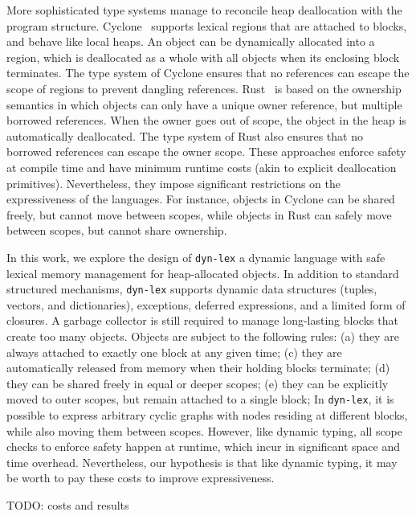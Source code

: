 \documentclass[12pt]{article}
\newcommand{\code}[1] {\texttt{\footnotesize{#1}}}
\newcommand{\lex} {\code{dyn-lex}\xspace}
\begin{document}
More sophisticated type systems manage to reconcile heap deallocation with the
program structure.
%
Cyclone~\cite{TODO} supports lexical regions that are attached to blocks, and
behave like local heaps.
An object can be dynamically allocated into a region, which is deallocated as a
whole with all objects when its enclosing block terminates.
The type system of Cyclone ensures that no references can escape the scope of
regions to prevent dangling references.
%
Rust~\cite{TODO} is based on the ownership semantics in which objects can only
have a unique owner reference, but multiple borrowed references.
When the owner goes out of scope, the object in the heap is automatically
deallocated.
The type system of Rust also ensures that no borrowed references can escape the
owner scope.
%
These approaches enforce safety at compile time and have minimum runtime costs
(akin to explicit deallocation primitives).
Nevertheless, they impose significant restrictions on the expressiveness of the
languages.
For instance, objects in Cyclone can be shared freely, but cannot move between
scopes, while objects in Rust can safely move between scopes, but cannot share
ownership.

In this work, we explore the design of \lex a dynamic language with safe
lexical memory management for heap-allocated objects.
%
In addition to standard structured mechanisms, \lex supports dynamic data
structures (tuples, vectors, and dictionaries), exceptions, deferred
expressions, and a limited form of closures.
A garbage collector is still required to manage long-lasting blocks that create
too many objects.
%
Objects are subject to the following rules:
    (a) they are always attached to exactly one block at any given time;
    (c) they are automatically released from memory when their holding blocks
        terminate;
    (d) they can be shared freely in equal or deeper scopes;
    (e) they can be explicitly moved to outer scopes, but remain attached to a
        single block;
%
In \lex, it is possible to express arbitrary cyclic graphs with nodes residing
at different blocks, while also moving them between scopes.
%
However, like dynamic typing, all scope checks to enforce safety happen at
runtime, which incur in significant space and time overhead.
Nevertheless, our hypothesis is that like dynamic typing, it may be worth to
pay these costs to improve expressiveness.

TODO: costs and results
\end{document}
